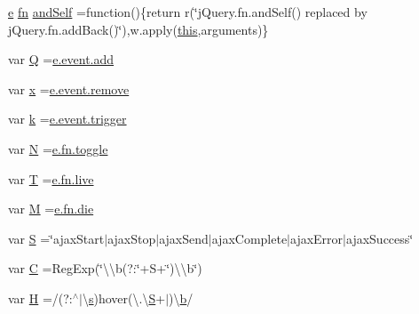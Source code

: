 \begin{DoxyCompactItemize}
\item 
\hyperlink{jqplot_8barRenderer_8min_8js_a2ce90ea5f2a400a3a152319491a737ff}{e} \hyperlink{jquery_8min_8js_af453dd93808e2e2826fd92ab8c394cfc}{fn} \hyperlink{jquery-1_8x_8min_8js_a87feebad0d5e7f093f60e89bd1135092}{and\+Self} =function()\{return r(\char`\"{}j\+Query.\+fn.\+and\+Self() replaced by j\+Query.\+fn.\+add\+Back()\char`\"{}),w.\+apply(\hyperlink{jquery_8parallax-scroll_8min_8js_a05c09a5e9d53fa7adf0a7936038c2fa3}{this},arguments)\}
\item 
var \hyperlink{jquery-1_8x_8min_8js_a044ff3ae9eca11d4603780243cdfc911}{Q} =\hyperlink{common_2js_2jquery_8js_a638fd10c6d2f5e258459b1abfa3b94ea}{e.\+event.\+add}
\item 
var \hyperlink{jquery-1_8x_8min_8js_a81e910173af87b1161e719a504d52407}{x} =\hyperlink{common_2js_2jquery_8js_ac2bfeac9f445211e9176a527d3a292c4}{e.\+event.\+remove}
\item 
var \hyperlink{jquery-1_8x_8min_8js_ab26645c014aa005ecedef329ecf58c99}{k} =\hyperlink{common_2js_2jquery_8js_a3a2670632785d79909fadd16431e30f9}{e.\+event.\+trigger}
\item 
var \hyperlink{jquery-1_8x_8min_8js_ab8a5cba0bbaa18ec7f830663874cb9d0}{N} =\hyperlink{common_2js_2jquery_8js_ac78f284f91282bbaa8bfd9763293cebb}{e.\+fn.\+toggle}
\item 
var \hyperlink{jquery-1_8x_8min_8js_aa798e0c32253f973f3154aa30c996eb2}{T} =\hyperlink{common_2js_2jquery_8js_ab8c156c437a408c01f80567143402f4b}{e.\+fn.\+live}
\item 
var \hyperlink{jquery-1_8x_8min_8js_af33e4fb80081524297d84c89540aeaca}{M} =\hyperlink{common_2js_2jquery_8js_af7e4e16696e8209560e9d5e304ea7628}{e.\+fn.\+die}
\item 
var \hyperlink{jquery-1_8x_8min_8js_a8bab16140cede5f71c657e8dc46c1887}{S} =\char`\"{}ajax\+Start$\vert$ajax\+Stop$\vert$ajax\+Send$\vert$ajax\+Complete$\vert$ajax\+Error$\vert$ajax\+Success\char`\"{}
\item 
var \hyperlink{jquery-1_8x_8min_8js_ae59e0ac8d0c43c81f50236f719763efc}{C} =Reg\+Exp(\char`\"{}\textbackslash{}\textbackslash{}b(?\+:\char`\"{}+S+\char`\"{})\textbackslash{}\textbackslash{}b\char`\"{})
\item 
var \hyperlink{jquery-1_8x_8min_8js_abd057520df7a5dc64fe29b4edd3166a3}{H} =/(?\+:$^\wedge$$\vert$\textbackslash{}\hyperlink{respond_8min_8js_ad9a7d92cb87932d25187fdec3ba1b621}{s})hover(\textbackslash{}.\textbackslash{}\hyperlink{jquery-1_8x_8min_8js_a8bab16140cede5f71c657e8dc46c1887}{S}+$\vert$)\textbackslash{}\hyperlink{jqplot_8barRenderer_8min_8js_a2fc619a5cd76c0e5c2bd9f57a6fcbd3e}{b}/
$$
\end{DoxyCompactItemize}
